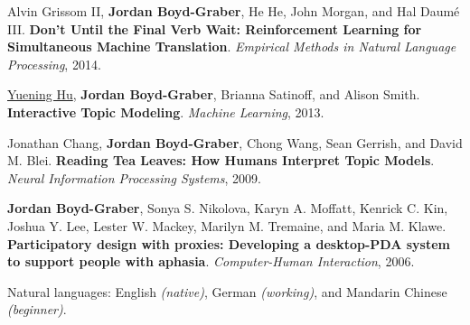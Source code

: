 \documentclass[10pt,a4paper]{article} %
\begin{document}
\begin{multicols}{2}
\begin{enumerate*}
\item Alvin {Grissom II}, {\bf Jordan Boyd-Graber}, He He, John Morgan, and Hal {Daum\'{e} III}.  {\bf Don't Until the Final Verb Wait: Reinforcement Learning for Simultaneous Machine Translation}.  \emph{Empirical Methods in Natural Language Processing}, 2014.

\item \underline{Yuening Hu}, {\bf Jordan Boyd-Graber}, Brianna
  Satinoff, and Alison Smith.  {\bf Interactive Topic Modeling}.
  \emph{Machine Learning}, 2013.

\item Jonathan Chang, {\bf Jordan Boyd-Graber}, Chong Wang, Sean Gerrish,
and David M. Blei.  {\bf Reading Tea Leaves: How Humans Interpret
  Topic Models}.  \emph{Neural Information Processing Systems}, 2009.

\item {\bf Jordan Boyd-Graber}, Sonya S. Nikolova, Karyn A. Moffatt, Kenrick
C. Kin, Joshua Y. Lee, Lester W. Mackey, Marilyn M. Tremaine, and
Maria M. Klawe.  {\bf Participatory design with proxies: {D}eveloping
  a desktop-{PDA} system to support people with aphasia}.
\emph{Computer-Human Interaction}, 2006.


\end{enumerate*}

\end{multicols}

\spacedhrule{1.6em}{-0.4em} %


\inlineheadsection %
{Natural languages:}
{English \textit{(native)}, German \textit{(working)}, and Mandarin Chinese \textit{(beginner)}.}

\end{document}

